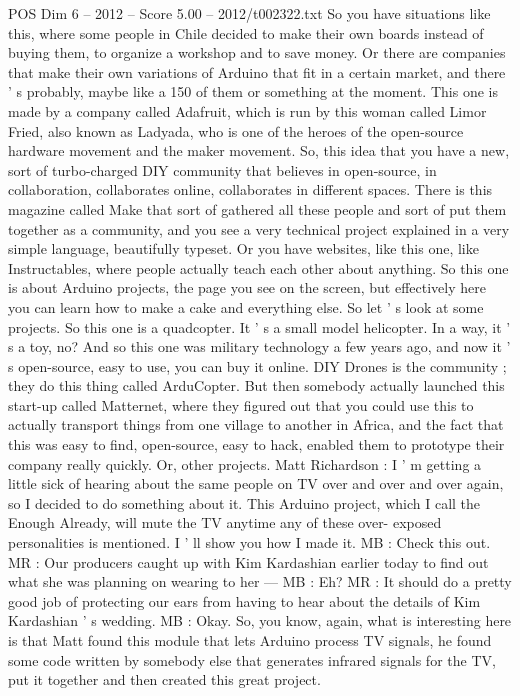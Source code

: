 \begin{textsample}{POS Dim 6 – 2012 – Score 5.00 – 2012/t002322.txt}
So you have situations like this, where some people in Chile decided to make their own boards instead of buying them, to organize a workshop and to save money.
Or there are companies that make their own variations of Arduino that fit in a certain market, and there ' s probably, maybe like a 150 of them or something at the moment.
This one is made by a company called Adafruit, which is run by this woman called Limor Fried, also known as Ladyada, who is one of the heroes of the open-source hardware movement and the maker movement.
So, this idea that you have a new, sort of turbo-charged DIY community that believes in open-source, in collaboration, collaborates online, collaborates in different spaces.
There is this magazine called Make that sort of gathered all these people and sort of put them together as a community, and you see a very technical project explained in a very simple language, beautifully typeset.
Or you have websites, like this one, like Instructables, where people actually teach each other about anything.
So this one is about Arduino projects, the page you see on the screen, but effectively here you can learn how to make a cake and everything else.
So let ' s look at some projects.
So this one is a quadcopter.
It ' s a small model helicopter.
In a way, it ' s a toy, no?
And so this one was military technology a few years ago, and now it ' s open-source, easy to use, you can buy it online.
DIY Drones is the community ; they do this thing called ArduCopter.
But then somebody actually launched this start-up called Matternet, where they figured out that you could use this to actually transport things from one village to another in Africa, and the fact that this was easy to find, open-source, easy to hack, enabled them to prototype their company really quickly.
Or, other projects.
Matt Richardson : I ' m getting a little sick of hearing about the same people on TV over and over and over again, so I decided to do something about it.
This Arduino project, which I call the Enough Already, will mute the TV anytime any of these over- exposed personalities is mentioned.
I ' ll show you how I made it.
MB : Check this out.
MR : Our producers caught up with Kim Kardashian earlier today to find out what she was planning on wearing to her — MB : Eh?
MR : It should do a pretty good job of protecting our ears from having to hear about the details of Kim Kardashian ' s wedding.
MB : Okay.
So, you know, again, what is interesting here is that Matt found this module that lets Arduino process TV signals, he found some code written by somebody else that generates infrared signals for the TV, put it together and then created this great project.

\end{textsample}
